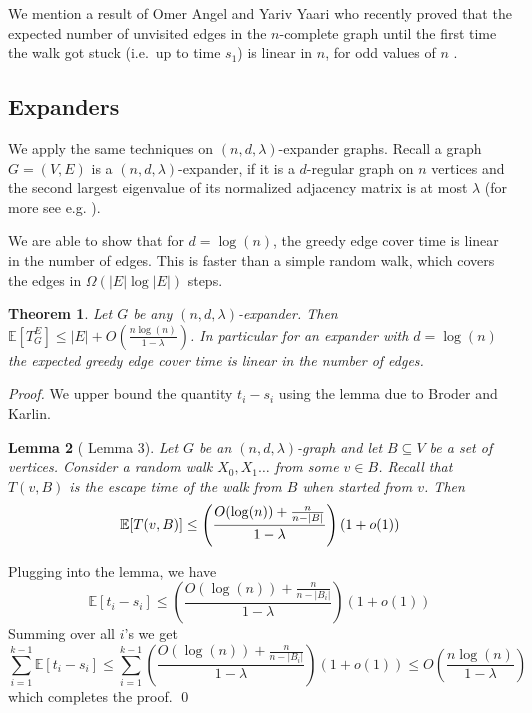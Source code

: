 \documentclass[12pt,a4paper]{article}
\newcommand{\0}{{\bf 0}}
\newcommand{\seq}{\subseteq}
\newcommand{\E}{{\mathbb E}}
\newtheorem{theorem}{Theorem}[section]
\newtheorem{lemma}[theorem]{Lemma}
\begin{document}
    We mention a result of Omer Angel and Yariv Yaari who recently proved that the expected number of unvisited edges
    in the $n$-complete graph until the first time the walk got stuck (i.e.\ up to time $s_1$) is linear in $n$,
    for odd values of $n$ \cite{AngelYaari}.

\subsection{Expanders}\label{subsec:expanders}

    We apply the same techniques on $(n,d,\lambda)$-expander graphs.
    Recall a graph $G = (V,E)$ is a $(n, d, \lambda)$-expander,
    if it is a $d$-regular graph on $n$ vertices
    and the second largest eigenvalue of its normalized adjacency matrix is at most $\lambda$
    (for more see e.g. \cite{HLW06}).

    We are able to show that for $d = \log(n)$, the greedy edge cover time is linear in the number of edges.
    This is faster than a simple random walk, which covers the edges in $\Omega ( |E| \log |E| )$ steps.

    \begin{theorem}\label{thm:spectral_bound}
        Let $G$ be any $(n, d, \lambda)$-expander.
        Then $\E[T^E_G] \leq |E| + O \left( \frac{n \log(n)}{1-\lambda} \right)$.
        In particular for an expander with $d = \log(n)$ the expected greedy edge cover time is linear in the number of edges.
    \end{theorem}

    \begin{proof}
    We upper bound the quantity $t_i - s_i$ using the lemma due to Broder and Karlin.

    \begin{lemma}[\cite{BroderKarlin89} Lemma 3]
        Let $G$ be an $(n,d,\lambda)$-graph and let $B \seq V$ be a set of vertices.
        Consider a random walk $X_0, X_1 \dots$ from some $v \in B$.
        Recall that $T(v,B)$ is the escape time of the walk from $B$ when started from $v$.
        Then
        \[
            \E[T(v,B)] \leq \left( \frac{O( \log(n) ) + \frac{n}{n-|B|}}{1 - \lambda} \right) (1 + o(1))
    \qedhere\]
    \end{lemma}
    Plugging into the lemma, we have
    \[
        \E[t_i - s_i]  \leq  \left( \frac{O( \log(n) ) + \frac{n}{n-|B_i|}}{1 - \lambda} \right) (1 + o(1))
    \]
    Summing over all $i$'s we get
    \[
        \sum_{i=1}^{k-1} \E[t_i - s_i] \leq \sum_{i=1}^{k-1} \left( \frac{O( \log(n) ) + \frac{n}{n-|B_i|}}{1 - \lambda} \right) (1 + o(1))
                \leq O \left(\frac{n \log(n)}{1 - \lambda} \right)
    \]
    which completes the proof. \qed
    \end{proof}
\end{document}
